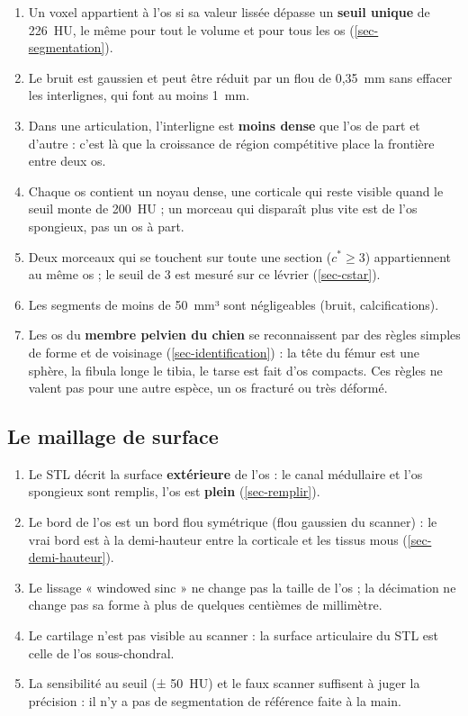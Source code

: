 \documentclass[11pt,a4paper]{article}
\begin{document}
\begin{enumerate}[label=S\arabic*.]
  \item Un voxel appartient à l'os si sa valeur lissée dépasse un \textbf{seuil unique} de 226~HU, le même pour tout
  le volume et pour tous les os (\cref{sec-segmentation}).
  \item Le bruit est gaussien et peut être réduit par un flou de 0,35~mm sans effacer les interlignes, qui font au
  moins 1~mm.
  \item Dans une articulation, l'interligne est \textbf{moins dense} que l'os de part et d'autre : c'est là que la
  croissance de région compétitive place la frontière entre deux os.
  \item Chaque os contient un noyau dense, une corticale qui reste visible quand le seuil monte de 200~HU ; un morceau
  qui disparaît plus vite est de l'os spongieux, pas un os à part.
  \item Deux morceaux qui se touchent sur toute une section ($c^* \geq 3$) appartiennent au même os ; le seuil de 3 est
  mesuré sur ce lévrier (\cref{sec-cstar}).
  \item Les segments de moins de 50~mm³ sont négligeables (bruit, calcifications).
  \item Les os du \textbf{membre pelvien du chien} se reconnaissent par des règles simples de forme et de voisinage
  (\cref{sec-identification}) : la tête du fémur est une sphère, la fibula longe le tibia, le tarse est fait d'os
  compacts. Ces règles ne valent pas pour une autre espèce, un os fracturé ou très déformé.
\end{enumerate}

\subsection{Le maillage de surface}

\begin{enumerate}[label=M\arabic*.]
  \item Le STL décrit la surface \textbf{extérieure} de l'os : le canal médullaire et l'os spongieux sont remplis, l'os
  est \textbf{plein} (\cref{sec-remplir}).
  \item Le bord de l'os est un bord flou symétrique (flou gaussien du scanner) : le vrai bord est à la demi-hauteur
  entre la corticale et les tissus mous (\cref{sec-demi-hauteur}).
  \item Le lissage « windowed sinc » ne change pas la taille de l'os ; la décimation ne change pas sa forme à plus de
  quelques centièmes de millimètre.
  \item Le cartilage n'est pas visible au scanner : la surface articulaire du STL est celle de l'os sous-chondral.
  \item La sensibilité au seuil (± 50~HU) et le faux scanner suffisent à juger la précision : il n'y a pas de
  segmentation de référence faite à la main.
\end{enumerate}
\end{document}
